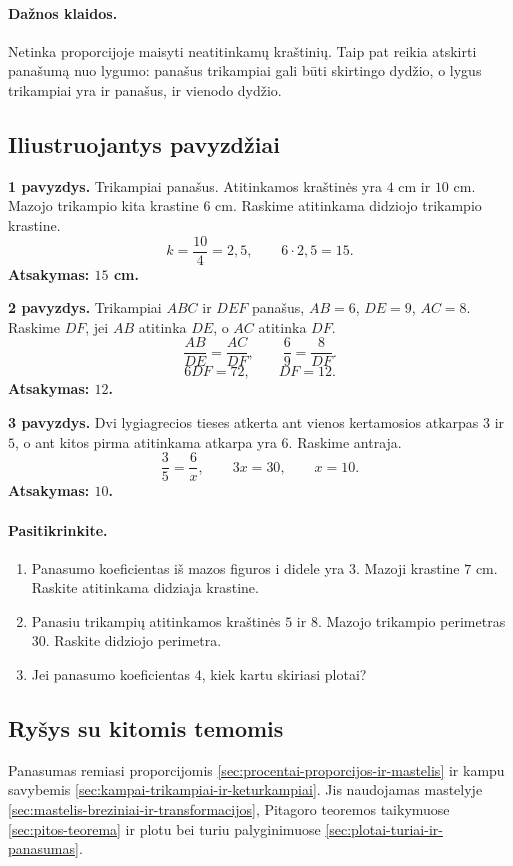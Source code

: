 \paragraph{Dažnos klaidos.}
Netinka proporcijoje maisyti neatitinkamų kraštinių. Taip pat reikia atskirti panašumą nuo lygumo: panašus trikampiai gali būti skirtingo dydžio, o lygus trikampiai yra ir panašus, ir vienodo dydžio.

\subsection{Iliustruojantys pavyzdžiai}
\textbf{1 pavyzdys.} Trikampiai panašus. Atitinkamos kraštinės yra $4$ cm ir $10$ cm. Mazojo trikampio kita krastine $6$ cm. Raskime atitinkama didziojo trikampio krastine.
\[
k=\frac{10}{4}=2{,}5,\qquad 6\cdot2{,}5=15.
\]
\textbf{Atsakymas: $15$ cm.}

\textbf{2 pavyzdys.} Trikampiai $ABC$ ir $DEF$ panašus, $AB=6$, $DE=9$, $AC=8$. Raskime $DF$, jei $AB$ atitinka $DE$, o $AC$ atitinka $DF$.
\[
\frac{AB}{DE}=\frac{AC}{DF},\qquad \frac69=\frac8{DF}.
\]
\[
6DF=72,\qquad DF=12.
\]
\textbf{Atsakymas: $12$.}

\textbf{3 pavyzdys.} Dvi lygiagrecios tieses atkerta ant vienos kertamosios atkarpas $3$ ir $5$, o ant kitos pirma atitinkama atkarpa yra $6$. Raskime antraja.
\[
\frac35=\frac6x,\qquad 3x=30,\qquad x=10.
\]
\textbf{Atsakymas: $10$.}

\paragraph{Pasitikrinkite.}
\begin{enumerate}[label=\alph*)]
\item Panasumo koeficientas iš mazos figuros i didele yra $3$. Mazoji krastine $7$ cm. Raskite atitinkama didziaja krastine.
\item Panasiu trikampių atitinkamos kraštinės $5$ ir $8$. Mazojo trikampio perimetras $30$. Raskite didziojo perimetra.
\item Jei panasumo koeficientas $4$, kiek kartu skiriasi plotai?
\end{enumerate}

\subsection{Ryšys su kitomis temomis}
Panasumas remiasi proporcijomis \ref{sec:procentai-proporcijos-ir-mastelis} ir kampu savybemis \ref{sec:kampai-trikampiai-ir-keturkampiai}. Jis naudojamas mastelyje \ref{sec:mastelis-breziniai-ir-transformacijos}, Pitagoro teoremos taikymuose \ref{sec:pitos-teorema} ir plotu bei turiu palyginimuose \ref{sec:plotai-turiai-ir-panasumas}.

